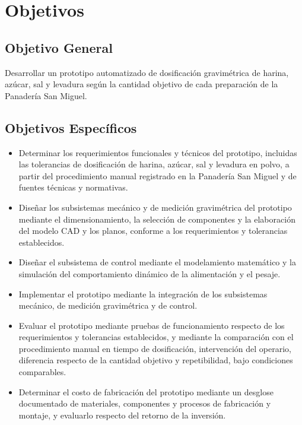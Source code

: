 \section{Objetivos}
\label{sec:objetivos}

\subsection{Objetivo General}
\label{subsec:objetivo_general}

Desarrollar un prototipo automatizado de dosificación gravimétrica de
harina, azúcar, sal y levadura según la cantidad objetivo de cada
preparación de la Panadería San Miguel.

\subsection{Objetivos Específicos}
\label{subsec:objetivos_especificos}

\begin{itemize}

    \item Determinar los requerimientos funcionales y técnicos del
    prototipo, incluidas las tolerancias de dosificación de harina,
    azúcar, sal y levadura en polvo, a partir del procedimiento manual
    registrado en la Panadería San Miguel y de fuentes técnicas y normativas.

    \item Diseñar los subsistemas mecánico y de medición gravimétrica del
    prototipo mediante el dimensionamiento, la selección de componentes y
    la elaboración del modelo CAD y los planos, conforme a los
    requerimientos y tolerancias establecidos.

    \item Diseñar el subsistema de control mediante el modelamiento
    matemático y la simulación del comportamiento dinámico de la
    alimentación y el pesaje.

    \item Implementar el prototipo mediante la integración de los
    subsistemas mecánico, de medición gravimétrica y de control.

    \item Evaluar el prototipo mediante pruebas de funcionamiento respecto
    de los requerimientos y tolerancias establecidos, y mediante la
    comparación con el procedimiento manual en tiempo de dosificación,
    intervención del operario, diferencia respecto de la cantidad objetivo
    y repetibilidad, bajo condiciones comparables.

    \item Determinar el costo de fabricación del prototipo mediante un
    desglose documentado de materiales, componentes y procesos de
    fabricación y montaje, y evaluarlo respecto del retorno de la
    inversión.

\end{itemize}

